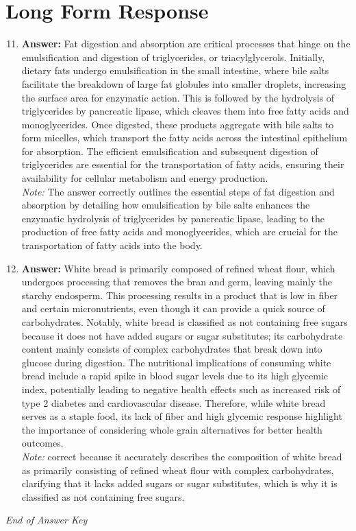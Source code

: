 \documentclass[12pt]{article}
\begin{document}
\section*{Long Form Response}
\begin{enumerate}[label=\arabic*.]
\setcounter{enumi}{10}
\item \textbf{Answer:} Fat digestion and absorption are critical processes that hinge on the emulsification and digestion of triglycerides, or triacylglycerols. Initially, dietary fats undergo emulsification in the small intestine, where bile salts facilitate the breakdown of large fat globules into smaller droplets, increasing the surface area for enzymatic action. This is followed by the hydrolysis of triglycerides by pancreatic lipase, which cleaves them into free fatty acids and monoglycerides. Once digested, these products aggregate with bile salts to form micelles, which transport the fatty acids across the intestinal epithelium for absorption. The efficient emulsification and subsequent digestion of triglycerides are essential for the transportation of fatty acids, ensuring their availability for cellular metabolism and energy production.
\\ \textit{Note:} The answer correctly outlines the essential steps of fat digestion and absorption by detailing how emulsification by bile salts enhances the enzymatic hydrolysis of triglycerides by pancreatic lipase, leading to the production of free fatty acids and monoglycerides, which are crucial for the transportation of fatty acids into the body.
\item \textbf{Answer:} White bread is primarily composed of refined wheat flour, which undergoes processing that removes the bran and germ, leaving mainly the starchy endosperm. This processing results in a product that is low in fiber and certain micronutrients, even though it can provide a quick source of carbohydrates. Notably, white bread is classified as not containing free sugars because it does not have added sugars or sugar substitutes; its carbohydrate content mainly consists of complex carbohydrates that break down into glucose during digestion. The nutritional implications of consuming white bread include a rapid spike in blood sugar levels due to its high glycemic index, potentially leading to negative health effects such as increased risk of type 2 diabetes and cardiovascular disease. Therefore, while white bread serves as a staple food, its lack of fiber and high glycemic response highlight the importance of considering whole grain alternatives for better health outcomes.
\\ \textit{Note:} correct because it accurately describes the composition of white bread as primarily consisting of refined wheat flour with complex carbohydrates, clarifying that it lacks added sugars or sugar substitutes, which is why it is classified as not containing free sugars.
\end{enumerate}

\vfill
\noindent\textit{End of Answer Key}
\end{document}
